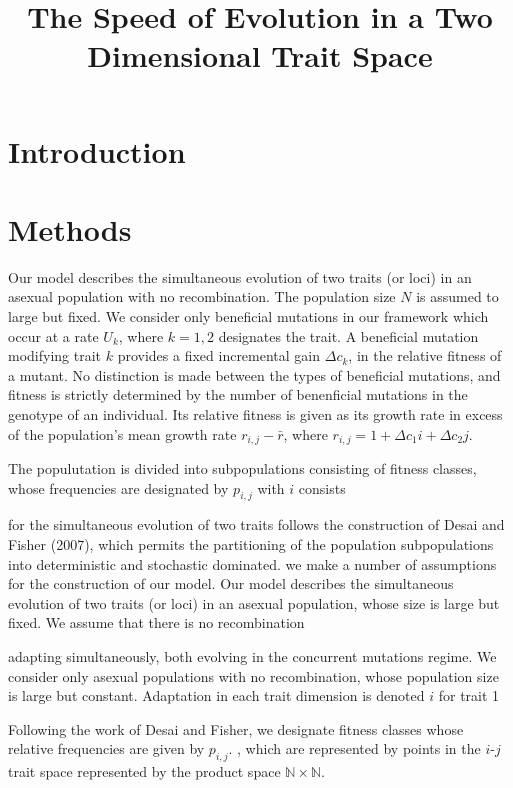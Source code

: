 \documentclass{article}
\begin{document}
\title{The Speed of Evolution in a Two Dimensional Trait Space}

\section*{Introduction}

\section*{Methods}
Our model describes the simultaneous evolution of two traits (or loci) in an asexual population with no recombination.  The population size $N$ is assumed to large but fixed.  We consider only beneficial mutations in our framework which occur at a rate $U_k$, where $k=1,2$ designates the trait.  A beneficial mutation modifying trait $k$ provides a fixed incremental gain $\Delta c_k$, in the relative fitness of a mutant.  No distinction is made between the types of beneficial mutations, and fitness is strictly determined by the number of benenficial mutations in the genotype of an individual.  Its relative fitness is given as its growth rate in excess of the population's mean growth rate $r_{i,j}-\bar{r}$, where $r_{i,j}=1+\Delta c_1 i + \Delta c_2 j$. 

The populutation is divided into subpopulations consisting of fitness classes, whose frequencies are designated by $p_{i,j}$ with $i$ consists 

for the simultaneous evolution of two traits follows the construction of Desai and Fisher (2007), which permits the partitioning of the population subpopulations into deterministic and stochastic dominated.  we make a number of assumptions for the construction of our model.  Our model describes the simultaneous evolution of two traits (or loci) in an asexual population, whose size is large but fixed.  We assume that there is no recombination     

adapting simultaneously, both evolving in the concurrent mutations regime.  We consider only asexual populations with no recombination, whose population size is large but constant.  Adaptation in each trait dimension is denoted $i$ for trait 1

Following the work of Desai and Fisher, we designate fitness classes whose relative frequencies are given by $p_{i,j}$.  
, which are represented by points in the $i$-$j$ trait space represented by the product space $\mathbb{N}\times \mathbb{N}$.
 
\end{document}
